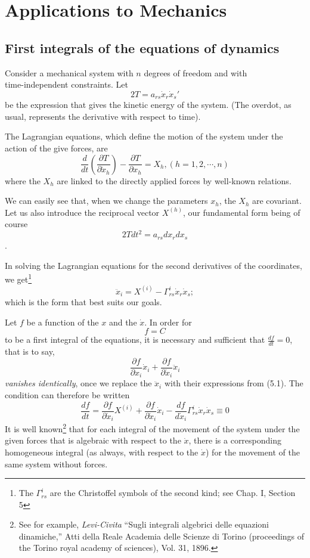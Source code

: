 \documentclass{book}
\begin{document}
\chapter{Applications to Mechanics}

\section{First integrals of the equations of dynamics}

Consider a mechanical system with $n$ degrees of freedom and with\\ time-independent constraints. Let
$$2T=a_{rs}\dot{x}_r\dot{x}_s'$$
be the expression that gives the kinetic energy of the system. (The overdot, as usual, represents the derivative with respect to time). 

The Lagrangian equations, which define the motion of the system under the action of the give forces, are
$$\frac{d}{dt}\left(\frac{\partial T}{\partial\dot{x}_h}\right)-\frac{\partial T}{\partial x_h}=X_h, (h=1,2,\cdots,n)$$
where the $X_h$ are linked to the directly applied forces by well-known relations. 

We can easily see that, when we change the parameters $x_h$, the $X_h$ are covariant. Let us also introduce the reciprocal vector $X^{(h)}$, our fundamental form being of course
$$2Tdt^2=a_{rs}dx_rdx_s$$.

In solving the Lagrangian equations for the second derivatives of the coordinates, we get\footnote{The $\Gamma_{rs}^i$ are the Christoffel symbols of the second kind; see Chap. I, Section 5}
\begin{equation}
\ddot{x}_i=X^{(i)}-\Gamma_{rs}^i\dot{x}_r\dot{x}_s;
\end{equation}
which is the form that best suits our goals.

Let $f$ be a function of the $x$ and the $\dot{x}$. In order for
$$f=C$$
to be a first integral of the equations, it is necessary and sufficient that $\frac{df}{dt}=0$, that is to say,
$$\frac{\partial f}{\partial x_i}\dot{x}_i+\frac{\partial f}{\partial\dot{x}_i}\ddot{x}_i$$
\emph{vanishes identically}, once we replace the $\ddot{x}_i$ with their expressions from (5.1). The condition can therefore be written 
\begin{equation}
\frac{df}{dt}=\frac{\partial f}{\partial\dot{x}_i}X^{(i)}+\frac{\partial f}{\partial\dot{x}_i}\dot{x}_i-\frac{df}{d\dot{x}_i}\Gamma_{rs}^i\dot{x}_r\dot{x}_s\equiv0
\end{equation}
It is well known\footnote{See for example, \emph{Levi-Civita} ``Sugli integrali algebrici delle equazioni dinamiche,'' Atti della Reale Academia delle Scienze di Torino (proceedings of the Torino royal academy of sciences), Vol. 31, 1896.} that for each integral of the movement of the system under the given forces that is algebraic with respect to the $\dot{x}$, there is a corresponding homogeneous integral (as always, with respect to the $\dot{x}$) for the movement of the same system without forces.
\end{document}
